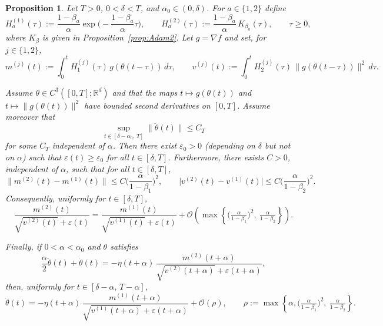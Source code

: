 \documentclass{article} %
\newtheorem{proposition}{Proposition}
\begin{document}
\begin{proposition}\label{prop:alpha-recovery}
Let $T>0$, $0<\delta<T$, and $\alpha_0\in(0,\delta)$. For $a\in\{1,2\}$ define
\[
H^{(1)}_a(\tau):=\frac{1-\beta_a}{\alpha}\exp\!\Big(-\frac{1-\beta_a}{\alpha}\tau\Big),
\qquad
H^{(2)}_a(\tau):=\frac{1-\beta_a}{\alpha}\,K_{\beta_a}(\tau),
\qquad \tau\ge 0,
\]
where $K_\beta$ is given in Proposition~\ref{prop:Adam2}. Let $g=\nabla f$ and set, for $j\in\{1,2\}$,
\[
m^{(j)}(t):=\int_0^t H^{(j)}_1(\tau)\,g(\theta(t-\tau))\,d\tau,
\qquad
v^{(j)}(t):=\int_0^t H^{(j)}_2(\tau)\,\|g(\theta(t-\tau))\|^2\,d\tau .
\]

Assume $\theta\in C^3([0,T];\mathbb R^d)$ and that the maps $t\mapsto g(\theta(t))$ and $t\mapsto \|g(\theta(t))\|^2$ have bounded second derivatives on $[0,T]$.
Assume moreover that
\[
\sup_{t\in[\delta-\alpha_0,\,T]}\|\ddot\theta(t)\|\le C_T
\]
for some $C_T$ independent of $\alpha$. Then there exist $\varepsilon_0>0$ (depending on $\delta$ but not on $\alpha$) such that $\varepsilon(t)\ge \varepsilon_0$ for all $t\in[\delta,T]$. Furthermore, there exists $C>0$, independent of $\alpha$, such that for all $t\in[\delta,T]$,
\[
\|m^{(2)}(t)-m^{(1)}(t)\|
\le C\Big(\frac{\alpha}{1-\beta_1}\Big)^{2},
\qquad
\bigl|v^{(2)}(t)-v^{(1)}(t)\bigr|
\le C\Big(\frac{\alpha}{1-\beta_2}\Big)^{2}.
\]
Consequently, uniformly for $t\in[\delta,T]$,
\[
\frac{m^{(2)}(t)}{\sqrt{v^{(2)}(t)}+\varepsilon(t)}
=
\frac{m^{(1)}(t)}{\sqrt{v^{(1)}(t)}+\varepsilon(t)}
+\mathcal{O}\!\left(\max\left\{\Big(\tfrac{\alpha}{1-\beta_1}\Big)^2,\ \tfrac{\alpha}{1-\beta_2}\right\}\right).
\]

Finally, if $0<\alpha<\alpha_0$ and $\theta$ satisfies
\[
\frac{\alpha}{2}\ddot\theta(t)+\dot\theta(t)
=
-\eta(t+\alpha)\,
\frac{m^{(2)}(t+\alpha)}{\sqrt{v^{(2)}(t+\alpha)}+\varepsilon(t+\alpha)},
\]
then, uniformly for $t\in[\delta-\alpha,\,T-\alpha]$,
\[
\dot\theta(t)
=
-\eta(t+\alpha)\,
\frac{m^{(1)}(t+\alpha)}{\sqrt{v^{(1)}(t+\alpha)}+\varepsilon(t+\alpha)}
+\mathcal{O}(\rho),
\qquad
\rho:=\max\left\{\alpha,\Big(\tfrac{\alpha}{1-\beta_1}\Big)^2,\ \tfrac{\alpha}{1-\beta_2}\right\}.
\]
\end{proposition}
\end{document}
